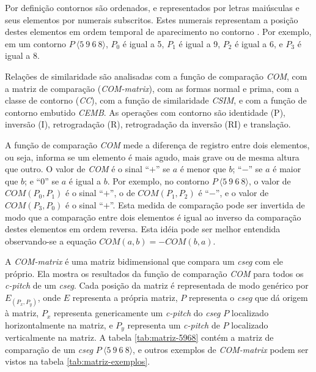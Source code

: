 \documentclass[brazil]{article}
\newcommand{\termo}[1]{\textit{#1}}
\begin{document}
Por definição contornos são ordenados, e representados por letras
maiúsculas e seus elementos por numerais subscritos. Estes numerais
representam a posição destes elementos em ordem temporal de
aparecimento no contorno \cite{marvin.ea87:relating}. Por exemplo, em
um contorno $P\:\langle5\:9\:6\:8\rangle$, $P_0$ é igual a 5, $P_1$ é
igual a 9, $P_2$ é igual a 6, e $P_3$ é igual a 8.

Relações de similaridade \cite{marvin.ea87:relating} são analisadas
com a função de comparação \termo{COM}, com a matriz de comparação
(\termo{COM-matrix}), com as formas normal e prima, com a classe de
contorno (\termo{CC}), com a função de similaridade \termo{CSIM}, e
com a função de contorno embutido \termo{CEMB}. As operações com
contorno são identidade (P), inversão (I), retrogradação (R),
retrogradação da inversão (RI) e translação.

A função de comparação \termo{COM} mede a diferença de registro entre
dois elementos, ou seja, informa se um elemento é mais agudo, mais
grave ou de mesma altura que outro. O valor de \termo{COM} é o sinal
``$+$'' se $a$ é menor que $b$; ``$-$'' se $a$ é maior que $b$; e
``$0$'' se $a$ é igual a $b$. Por exemplo, no contorno
$P\:\langle5\:9\:6\:8\rangle$, o valor de $COM(P_0,P_1)$ é o sinal
``$+$'', o de $COM(P_1,P_2)$ é ``$-$'', e o valor de $COM(P_3,P_0)$ é
o sinal ``$+$''. Esta medida de comparação pode ser invertida de modo
que a comparação entre dois elementos é igual ao inverso da comparação
destes elementos em ordem reversa. Esta idéia pode ser melhor
entendida observando-se a equação $COM(a,b)=-COM(b,a)$.

A \termo{COM-matrix} é uma matriz bidimensional que compara um
\termo{cseg} com ele próprio. Ela mostra os resultados da função de
comparação \termo{COM} para todos os \termo{c-pitch} de um
\termo{cseg}. Cada posição da matriz é representada de modo genérico
por $E_(P_x,P_y)$, onde $E$ representa a própria matriz, $P$
representa o \termo{cseg} que dá origem à matriz, $P_x$ representa
genericamente um \termo{c-pitch} do \termo{cseg} $P$ localizado
horizontalmente na matriz, e $P_y$ representa um \termo{c-pitch} de
$P$ localizado verticalmente na matriz. A tabela \ref{tab:matriz-5968}
contém a matriz de comparação de um \termo{cseg}
$P\:\langle5\:9\:6\:8\rangle$, e outros exemplos de \termo{COM-matrix}
podem ser vistos na tabela \ref{tab:matriz-exemplos}.
\end{document}
